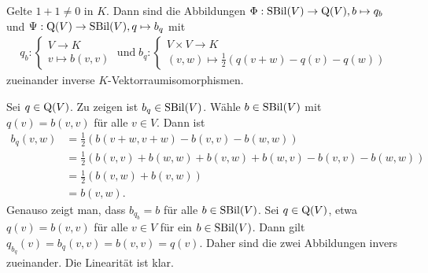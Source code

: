 \documentclass[../../main.tex]{subfiles}
\begin{document}
\begin{notpro}\label{13.4.6}
Gelte $1+1\neq 0$ in $K$. Dann sind die Abbildungen $\Phi:\operatorname{SBil}(V)\to \operatorname{Q}(V),b\mapsto q_b$ und $\Psi:\operatorname{Q}(V)\to \operatorname{SBil}(V),q\mapsto b_q$ mit 
\begin{align*}
	q_b:\begin{cases} V\to K\\ v\mapsto b(v,v)\end{cases}\;\text{und}\;
	b_q:\begin{cases} V\times V\to K\\ (v,w)\mapsto \frac{1}{2}\left(q(v+w)-q(v)-q(w)\right)\end{cases}
\end{align*}
zueinander inverse $K$-Vektorraumisomorphismen. 
\end{notpro}	
\begin{cproof}
Sei $q\in \operatorname{Q}(V)$. Zu zeigen ist $b_q\in \operatorname{SBil}(V)$. Wähle $b\in \operatorname{SBil}(V)$ mit $q(v)=b(v,v)$ für alle $v\in V$. Dann ist
\begin{align*}
b_q(v,w)&=\frac{1}{2}\left(b(v+w,v+w)-b(v,v)-b(w,w)\right)\\
&=\frac{1}{2}\left(b(v,v)+b(w,w)+b(v,w)+b(w,v)-b(v,v)-b(w,w)\right)\\
&=\frac{1}{2}\left(b(v,w)+b(v,w)\right)\\
&=b(v,w).
\end{align*}
Genauso zeigt man, dass $b_{q_b}=b$ für alle $b\in \operatorname{SBil}(V)$. Sei $q\in \operatorname{Q}(V)$, etwa $q(v)=b(v,v)$ für alle $v\in V$ für ein $b\in \operatorname{SBil}(V)$. Dann gilt $q_{b_q}(v)=b_q(v,v)=b(v,v)=q(v)$. Daher sind die zwei Abbildungen invers zueinander. Die Linearität ist klar.
\end{cproof}
\end{document}
